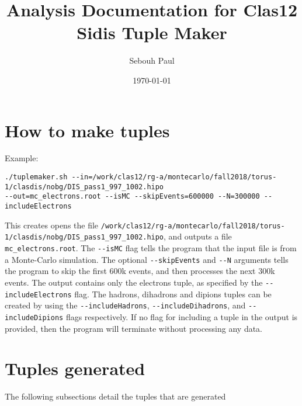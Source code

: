 \documentclass[english]{article}
\newcommand{\code}[1]{\texttt{#1}}
\begin{document}
\title{
Analysis Documentation for Clas12 Sidis Tuple Maker
}

\author{Sebouh Paul}
\date{\today}

\maketitle
\tableofcontents
\newpage

\section{How to make tuples}
Example:\\
\begin{verbatim}
./tuplemaker.sh --in=/work/clas12/rg-a/montecarlo/fall2018/torus-1/clasdis/nobg/DIS_pass1_997_1002.hipo
--out=mc_electrons.root --isMC --skipEvents=600000 --N=300000 --includeElectrons
 \end{verbatim}

This creates opens the file \code{/work/clas12/rg-a/montecarlo/fall2018/torus-1/clasdis/nobg/DIS\_pass1\_997\_1002.hipo}, and outputs a file \code{mc\_electrons.root}.  The \code{-{}-isMC} flag tells the program that the input file is from a Monte-Carlo simulation.  The optional \code{-{}-skipEvents} and \code{-{}-N} arguments tells the program to skip the first 600k events, and then processes the next 300k events.  The output contains only the electrons tuple, as specified by the \code{-{}-includeElectrons} flag.  The hadrons, dihadrons and dipions tuples can be created by using the \code{-{}-includeHadrons}, \code{-{}-includeDihadrons}, and \code{-{}-includeDipions} flags respectively.  If no flag for including a tuple in the output is provided, then the program will terminate without processing any data.  
 

\section{Tuples generated}
The following subsections detail the tuples that are generated
\end{document}
